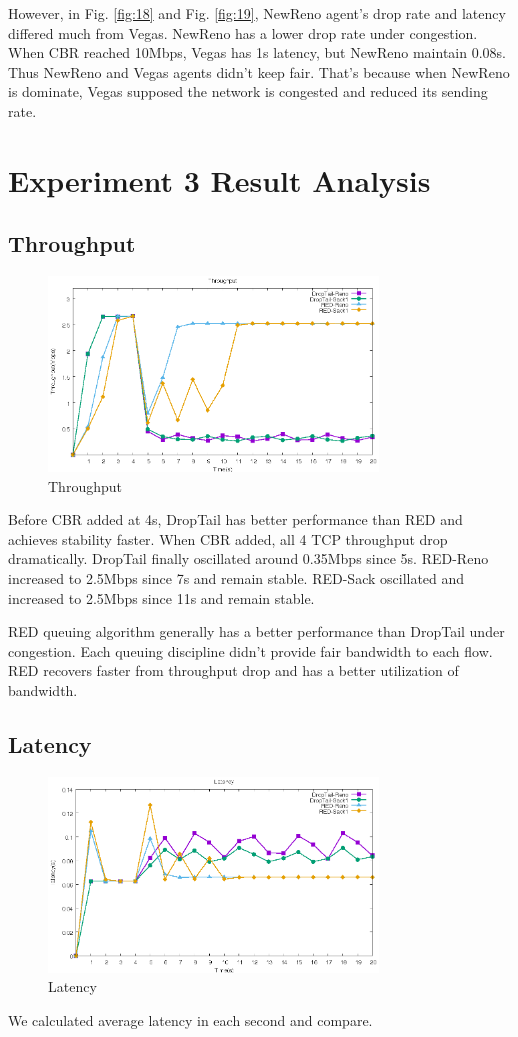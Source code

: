 \documentclass[10pt, conference]{IEEEtran}
\begin{document}
	However, in Fig. \ref{fig:18} and Fig. \ref{fig:19}, NewReno agent's drop rate and latency differed much from Vegas. NewReno has a lower drop rate under congestion. When CBR reached 10Mbps, Vegas has 1s latency, but NewReno maintain 0.08s. Thus NewReno and Vegas agents didn't keep fair. That's because when NewReno is dominate, Vegas supposed the network is congested and reduced its sending rate.
	\section{Experiment 3 Result Analysis}
	\subsection{Throughput}
	\begin{figure}[H]
		\centering
		\includegraphics[width=3.45in]{imgs/exp3_throughput.eps}
		\caption[Optional caption]{Throughput}
		\label{fig:20}
	\end{figure}
	Before CBR added at 4s, DropTail has better performance than RED and achieves stability faster. When CBR added, all 4 TCP throughput drop dramatically. DropTail finally oscillated around 0.35Mbps since 5s. RED-Reno increased to 2.5Mbps since 7s and remain stable. RED-Sack oscillated and increased to 2.5Mbps since 11s and remain stable.
	
	RED queuing algorithm generally has a better performance than DropTail under congestion. Each queuing discipline didn't provide fair bandwidth to each flow. RED recovers faster from throughput drop and has a better utilization of bandwidth.

	\subsection{Latency}
	\begin{figure}[H]
		\centering
		\includegraphics[width=3.45in]{imgs/exp3_latency.eps}
		\caption[Optional caption]{Latency}
		\label{fig:21}
	\end{figure}
	We calculated average latency in each second and compare.
	
\end{document}
